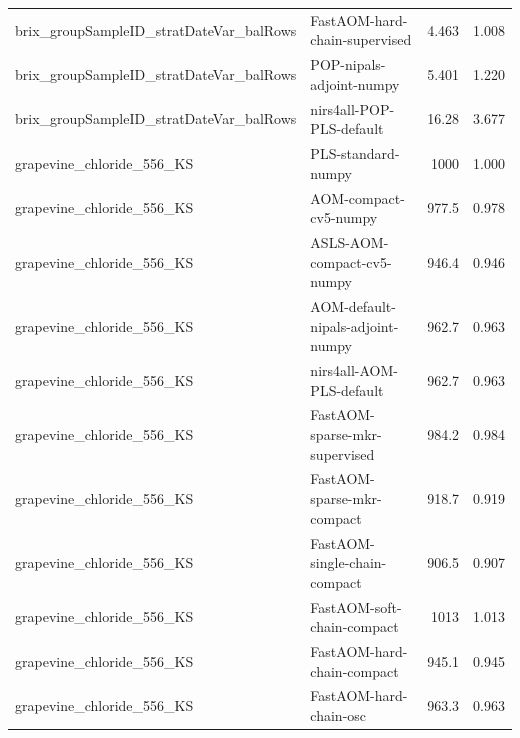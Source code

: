 \begin{landscape}
\begin{longtable}{L{8.0cm}L{9.5cm}rr}
brix\_\allowbreak{}groupSampleID\_\allowbreak{}stratDateVar\_\allowbreak{}balRows & FastAOM-\allowbreak{}hard-\allowbreak{}chain-\allowbreak{}supervised & 4.463 & 1.008 \\
brix\_\allowbreak{}groupSampleID\_\allowbreak{}stratDateVar\_\allowbreak{}balRows & POP-\allowbreak{}nipals-\allowbreak{}adjoint-\allowbreak{}numpy & 5.401 & 1.220 \\
brix\_\allowbreak{}groupSampleID\_\allowbreak{}stratDateVar\_\allowbreak{}balRows & nirs4all-\allowbreak{}POP-\allowbreak{}PLS-\allowbreak{}default & 16.28 & 3.677 \\
grapevine\_\allowbreak{}chloride\_\allowbreak{}556\_\allowbreak{}KS & PLS-\allowbreak{}standard-\allowbreak{}numpy & 1000 & 1.000 \\
grapevine\_\allowbreak{}chloride\_\allowbreak{}556\_\allowbreak{}KS & AOM-\allowbreak{}compact-\allowbreak{}cv5-\allowbreak{}numpy & 977.5 & 0.978 \\
grapevine\_\allowbreak{}chloride\_\allowbreak{}556\_\allowbreak{}KS & ASLS-\allowbreak{}AOM-\allowbreak{}compact-\allowbreak{}cv5-\allowbreak{}numpy & 946.4 & 0.946 \\
grapevine\_\allowbreak{}chloride\_\allowbreak{}556\_\allowbreak{}KS & AOM-\allowbreak{}default-\allowbreak{}nipals-\allowbreak{}adjoint-\allowbreak{}numpy & 962.7 & 0.963 \\
grapevine\_\allowbreak{}chloride\_\allowbreak{}556\_\allowbreak{}KS & nirs4all-\allowbreak{}AOM-\allowbreak{}PLS-\allowbreak{}default & 962.7 & 0.963 \\
grapevine\_\allowbreak{}chloride\_\allowbreak{}556\_\allowbreak{}KS & FastAOM-\allowbreak{}sparse-\allowbreak{}mkr-\allowbreak{}supervised & 984.2 & 0.984 \\
grapevine\_\allowbreak{}chloride\_\allowbreak{}556\_\allowbreak{}KS & FastAOM-\allowbreak{}sparse-\allowbreak{}mkr-\allowbreak{}compact & 918.7 & 0.919 \\
grapevine\_\allowbreak{}chloride\_\allowbreak{}556\_\allowbreak{}KS & FastAOM-\allowbreak{}single-\allowbreak{}chain-\allowbreak{}compact & 906.5 & 0.907 \\
grapevine\_\allowbreak{}chloride\_\allowbreak{}556\_\allowbreak{}KS & FastAOM-\allowbreak{}soft-\allowbreak{}chain-\allowbreak{}compact & 1013 & 1.013 \\
grapevine\_\allowbreak{}chloride\_\allowbreak{}556\_\allowbreak{}KS & FastAOM-\allowbreak{}hard-\allowbreak{}chain-\allowbreak{}compact & 945.1 & 0.945 \\
grapevine\_\allowbreak{}chloride\_\allowbreak{}556\_\allowbreak{}KS & FastAOM-\allowbreak{}hard-\allowbreak{}chain-\allowbreak{}osc & 963.3 & 0.963 \\

\end{longtable}
\end{landscape}
